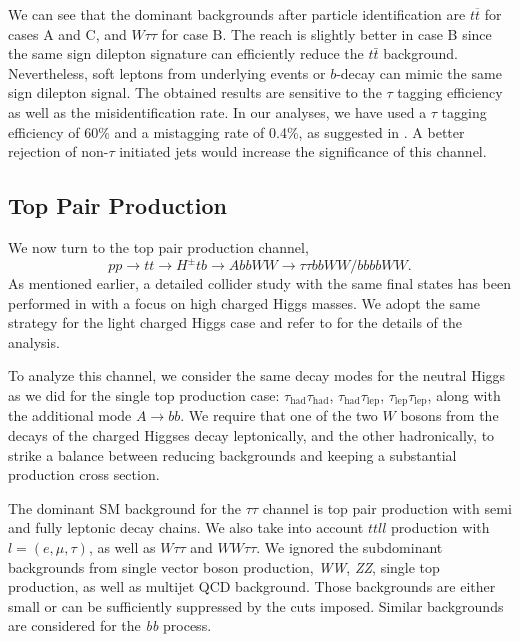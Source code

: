 We can see that the dominant backgrounds after particle identification are $t\overline{t}$ for cases A and C, and $W\tau\tau$ for case B. The reach is slightly better in case B since the same sign dilepton signature can efficiently reduce the $t\bar{t}$ background. Nevertheless, soft leptons from underlying events or $b$-decay can mimic the same sign dilepton signal. The obtained results are sensitive to the $\tau$ tagging efficiency as well as the misidentification rate. In our analyses, we have used a $\tau$ tagging efficiency of 60\% and a mistagging rate of 0.4\%, as suggested in \cite{Anderson:2013kxz}. A better rejection of non-$\tau$ initiated jets would increase the significance of this channel. 

\subsection{Top Pair Production}
 \label{sec:light_charged_analysis_tt}

We now turn to the top pair production channel, 
\begin{equation}
pp \rightarrow tt \rightarrow H^{\pm} tb \rightarrow AbbWW\rightarrow \tau\tau bbWW/bbbbWW.
\end{equation} 
As mentioned earlier, a detailed collider study with the same final states has been performed in \cite{Coleppa:2014cca} with a focus on high charged Higgs masses. We adopt the same strategy for the light charged Higgs case and refer to \cite{Coleppa:2014cca} for the details of the analysis. 

To analyze this channel, we consider the same decay modes for the neutral Higgs as we did for the single top production case: $\tau_\text{had}\tau_\text{had}$, $\tau_\text{had}\tau_\text{lep}$, $\tau_\text{lep}\tau_\text{lep}$, along with the additional mode $A\rightarrow bb$. We require that one of the two $W$ bosons from the decays of the charged Higgses decay leptonically, and the other hadronically, to strike a balance between reducing backgrounds and keeping a substantial production cross section.
 
The dominant SM background for the $\tau\tau$ channel is top pair production with  semi and fully leptonic decay chains. We also take into account $ttll$ production with $l = (e, \mu, \tau)$, as well as $W\tau\tau$ and $WW\tau\tau$. We ignored the subdominant backgrounds from single vector boson production, \emph{WW}, \emph{ZZ}, single top production, as well as multijet QCD background. Those backgrounds are either small or can be sufficiently suppressed by the cuts imposed. Similar backgrounds are considered for the \emph{bb} process. 

